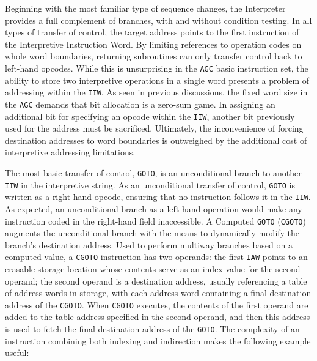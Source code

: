 \documentclass[refcap, oxford]{ahsan}
\begin{document}
Beginning with the most familiar type of sequence changes, the Interpreter provides a full complement of branches, with and without condition testing. In all types of transfer of control, the target address points to the first instruction of the Interpretive Instruction Word. By limiting references to operation codes on whole word boundaries, returning subroutines can only transfer control back to left-hand opcodes. While this is unsurprising in the \texttt{AGC} basic instruction set, the ability to store two interpretive operations in a single word presents a problem of addressing within the \texttt{IIW}. As seen in previous discussions, the fixed word size in the \texttt{AGC} demands that bit allocation is a zero-sum game. In assigning an additional bit for specifying an opcode within the \texttt{IIW}, another bit previously used for the address must be sacrificed. Ultimately, the inconvenience of forcing destination addresses to word boundaries is outweighed by the additional cost of interpretive addressing limitations. 

The most basic transfer of control, \texttt{GOTO}, is an unconditional branch to another \texttt{IIW} in the interpretive string. As an unconditional transfer of control, \texttt{GOTO} is written as a right-hand opcode, ensuring that no instruction follows it in the \texttt{IIW}. As expected, an unconditional branch as a left-hand operation would make any instruction coded in the right-hand field inaccessible. A Computed \texttt{GOTO} (\texttt{CGOTO}) augments the unconditional branch with the means to dynamically modify the branch's destination address. Used to perform multiway branches based on a computed value, a \texttt{CGOTO} instruction has two operands: the first \texttt{IAW} points to an erasable storage location whose contents serve as an index value for the second operand; the second operand is a destination address, usually referencing a table of address words in storage, with each address word containing a final destination address of the \texttt{CGOTO}. When \texttt{CGOTO} executes, the contents of the first operand are added to the table address specified in the second operand, and then this address is used to fetch the final destination address of the \texttt{GOTO}. The complexity of an instruction combining both indexing and indirection makes the following example useful:

\end{document}
